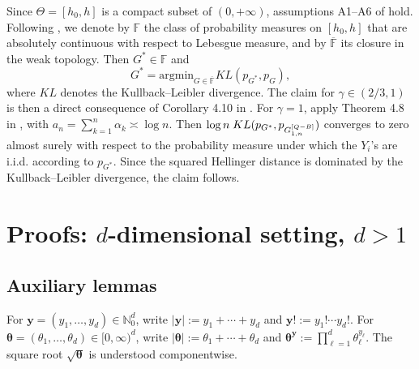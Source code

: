\documentclass[twoside,12pt]{article}
\begin{document}
Since $\Theta=[h_0,h]$ is a compact subset of $(0,+\infty)$, assumptions A1--A6 of \cite{MarTok(09)} hold. Following \cite{MarTok(09)}, we denote by $\mathbb F$ the class of probability measures on $[h_0,h]$ that are absolutely continuous with respect to Lebesgue measure, and by $\overline{\mathbb F}$ its closure in the weak topology. Then $G^*\in\mathbb F$ and
$$
G^\ast=\text{argmin}_{G\in \overline {\mathbb F}}KL(p_{G^\ast},p_G),
$$
where $KL$ denotes the Kullback--Leibler divergence. The claim for $\gamma\in (2/3,1)$ is then a direct consequence of Corollary 4.10 in \cite{MarTok(09)}. For $\gamma=1$, apply Theorem 4.8 in \cite{MarTok(09)}, with $a_n=\sum_{k=1}^n\alpha_k\asymp \log n$. Then
$\log n \;KL(p_{G^\ast},p_{G_{1,n}^{\tiny{[Q-B]}}} )$ converges to zero almost surely with respect to the probability measure under which the $Y_i$'s are i.i.d. according to $p_{G^\ast}$. Since the squared Hellinger distance is dominated by the Kullback--Leibler divergence, the claim follows.




\section{Proofs: $d$-dimensional setting, $d>1$}\label{app2}

\subsection{Auxiliary lemmas}

For $\boldsymbol y=(y_1,\ldots,y_d)\in\mathbb N_0^d$, write $|\boldsymbol y|:=y_1+\cdots+y_d$ and $\boldsymbol y!:=y_1!\cdots y_d!$. For $\boldsymbol\theta=(\theta_1,\ldots,\theta_d)\in[0,\infty)^d$, write $|\boldsymbol\theta|:=\theta_1+\cdots+\theta_d$ and $\boldsymbol\theta^{\boldsymbol y}:=\prod_{\ell=1}^d \theta_\ell^{y_\ell}$. The square root $\sqrt{\boldsymbol\theta}$ is understood componentwise.
\end{document}
